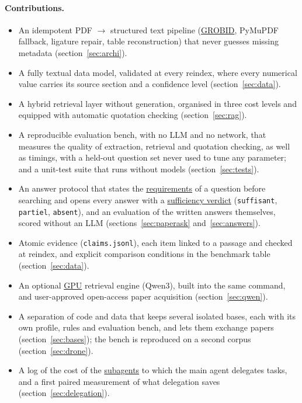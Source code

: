 \documentclass[11pt,a4paper]{article}
\newcommand{\cmd}[1]{\texttt{#1}}
\newcommand{\gl}[2]{\hyperlink{gl:#1}{\textcolor{glcolor}{#2}}}
\begin{document}
\paragraph{Contributions.}
\begin{itemize}
  \item An idempotent PDF $\rightarrow$ structured text pipeline (\gl{GROBID}{GROBID}, PyMuPDF fallback,
    ligature repair, table reconstruction) that never guesses missing metadata
    (section~\ref{sec:archi}).
  \item A fully textual data model, validated at every reindex, where every numerical value
    carries its source section and a confidence level (section~\ref{sec:data}).
  \item A hybrid retrieval layer without generation, organised in three cost levels and
    equipped with automatic quotation checking (section~\ref{sec:rag}).
  \item A reproducible evaluation bench, with no LLM and no network, that measures the
    quality of extraction, retrieval and quotation checking, as well as timings, with a
    held-out question set never used to tune any parameter; and a unit-test suite that runs
    without models (section~\ref{sec:tests}).
  \item An answer protocol that states the \gl{exigence}{requirements} of a question before searching and
    opens every answer with a \gl{verdict}{sufficiency verdict} (\cmd{suffisant}, \cmd{partiel},
    \cmd{absent}), and an evaluation of the written answers themselves, scored without an LLM
    (sections~\ref{sec:paperask} and~\ref{sec:answers}).
  \item Atomic evidence (\cmd{claims.jsonl}), each item linked to a passage and checked at
    reindex, and explicit comparison conditions in the benchmark table
    (section~\ref{sec:data}).
  \item An optional \gl{GPU}{GPU} retrieval engine (Qwen3), built into the same command, and user-approved
    open-access paper acquisition (section~\ref{sec:qwen}).
  \item A separation of code and data that keeps several isolated bases, each with its own
    profile, rules and evaluation bench, and lets them exchange papers
    (section~\ref{sec:bases}); the bench is reproduced on a second corpus
    (section~\ref{sec:drone}).
  \item A log of the cost of the \gl{sousagent}{subagents} to which the main agent delegates tasks, and a first
    paired measurement of what delegation saves (section~\ref{sec:delegation}).
\end{itemize}
\end{document}
